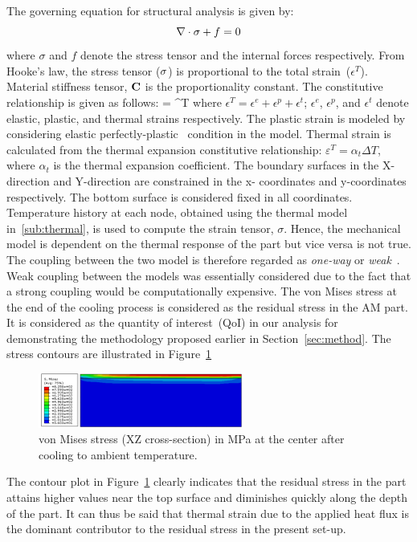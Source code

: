 The governing equation for structural analysis \cite{Megahed:2016} is given by:
%
\begin{equation}\label{eq_mechanical}
\nabla \cdot \mathbf{{\sigma}}+f = 0
\end{equation}
%
where $\sigma$ and $f$ denote the stress tensor and the internal forces respectively. From Hooke's law, the stress
tensor ($\mathbf{{\sigma}}$) is proportional to the total strain~($\epsilon^T$). Material stiffness tensor, $\mathbf{{C}}$ is the
proportionality constant. The constitutive relationship is given as follows:
%
\be
\mat{\sigma} = \epsilon^T
\ee
%
where $\epsilon^T = \epsilon^e + \epsilon^p+ \epsilon^t$; $\epsilon^e$, $\epsilon^p$, and $\epsilon^t$ denote elastic, 
plastic, and thermal strains respectively. The plastic strain is modeled by considering elastic 
perfectly-plastic~\cite{Zhao:2015} condition in the model. Thermal strain is calculated  from the thermal expansion 
constitutive relationship: $\varepsilon^T = \alpha_{t}\Delta T$, where $\alpha_t $ is the thermal expansion coefficient.
The boundary surfaces in the X-direction and Y-direction are constrained in the x-
coordinates and y-coordinates respectively. The bottom surface is considered fixed in all coordinates.
Temperature history at each node, obtained using the thermal model in~\ref{sub:thermal}, is used to
compute the strain tensor, $\sigma$. Hence, the mechanical model is dependent on the thermal response
of the part but vice versa is not true. The coupling between the two model is therefore regarded as \textit{one-way}
or \textit{weak}~\cite{Debroy:2017}. Weak coupling between the models was essentially considered due to the fact
that a strong coupling would be computationally expensive. The von Mises stress at the end of the cooling process
is considered as the residual stress in the AM part. It is considered as the quantity of interest~(QoI) in our analysis for 
demonstrating the methodology proposed earlier in Section~\ref{sec:method}. The stress contours are illustrated
in Figure~\ref{fig:subSmises} 
%
\begin{figure}[htbp]
\begin{center}
\includegraphics[width=0.6\textwidth]{./Figures/SMisesNom} 
\end{center}
\caption{von Mises stress (XZ cross-section) in MPa at the center after 
cooling to ambient temperature.}
\label{fig:subSmises}
\end{figure}
%
The contour plot in Figure~\ref{fig:subSmises} clearly indicates that the residual stress in the part attains higher
values near the top surface and diminishes quickly along the depth of the part. It can thus be said that thermal
strain due to the applied heat flux is the dominant contributor to the residual stress in the present set-up. 

